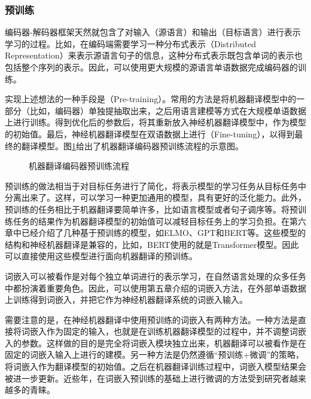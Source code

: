 
\subsubsection{预训练}

\parinterval 编码器-解码器框架天然就包含了对输入（源语言）和输出（目标语言）进行表示学习的过程。比如，在编码端需要学习一种分布式表示（Distributed Representation）来表示源语言句子的信息，这种分布式表示既包含单词的表示也包括整个序列的表示。因此，可以使用更大规模的源语言单语数据完成编码器的训练。

\parinterval 实现上述想法的一种手段是{\small{}}（Pre-training）。常用的方法是将机器翻译模型中的一部分（比如，编码器）单独提抽取出来，之后用语言建模等方式在大规模单语数据上进行训练。得到优化后的参数后，将其重新放入神经机器翻译模型中，作为模型的初始值。最后，神经机器翻译模型在双语数据上进行{\small{}}（Fine-tuning），以得到最终的翻译模型。图\ref{fig:7-38}给出了机器翻译编码器预训练流程的示意图。

\begin{figure}[htp]
\centering

\caption{机器翻译编码器预训练流程}
\label{fig:7-38}
\end{figure}

\parinterval 预训练的做法相当于对目标任务进行了简化，将表示模型的学习任务从目标任务中分离出来了。这样，可以学习一种更加通用的模型，具有更好的泛化能力。此外，预训练的任务相比于机器翻译要简单许多，比如语言模型或者句子调序等。将预训练任务的结果作为机器翻译模型的初始值可以减轻目标任务上的学习负担。在第六章中已经介绍了几种基于预训练的模型，如ELMO、GPT和BERT等。这些模型的结构和神经机器翻译是兼容的，比如，BERT使用的就是Transformer模型。因此可以直接使用这些模型进行面向机器翻译的预训练。


\parinterval 词嵌入可以被看作是对每个独立单词进行的表示学习，在自然语言处理的众多任务中都扮演着重要角色\cite{DBLP:journals/corr/abs-1901-09069}。因此，可以使用第五章介绍的词嵌入方法，在外部单语数据上训练得到词嵌入，并把它作为神经机器翻译系统的词嵌入输入。

\parinterval 需要注意的是，在神经机器翻译中使用预训练的词嵌入有两种方法。一种方法是直接将词嵌入作为固定的输入，也就是在训练机器翻译模型的过程中，并不调整词嵌入的参数。这样做的目的是完全将词嵌入模块独立出来，机器翻译可以被看作是在固定的词嵌入输入上进行的建模。另一种方法是仍然遵循``预训练+微调''的策略，将词嵌入作为翻译模型的初始值。之后在机器翻译训练过程中，词嵌入模型结果会被进一步更新。近些年，在词嵌入预训练的基础上进行微调的方法受到研究者越来越多的青睐。


